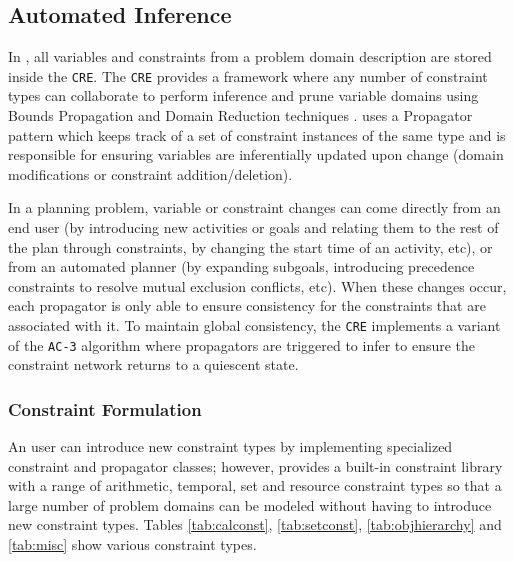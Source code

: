 \subsection{Automated Inference}
\label{sec:europa:inference}

In \eue, all variables and constraints from a problem domain
description are stored inside the \texttt{CRE}.  The \texttt{CRE}
provides a framework where any number of constraint types can
collaborate to perform inference and prune variable domains using
Bounds Propagation and Domain Reduction techniques \cite{marriott98}. 
\eu uses a Propagator pattern which keeps track of a set of
constraint instances of the same type and is responsible for ensuring
variables are inferentially updated upon change (domain modifications or
constraint addition/deletion).


In a planning problem, variable or constraint changes can come
directly from an end user (by introducing new activities or goals and
relating them to the rest of the plan through constraints, by changing
the start time of an activity, etc), or from an automated planner (by
expanding subgoals, introducing precedence constraints to resolve
mutual exclusion conflicts, etc). When these changes occur, each
propagator is only able to ensure consistency for the constraints that
are associated with it.  To maintain global consistency, the
\texttt{CRE} implements a variant of the \texttt{AC-3} algorithm
\cite{mackworth77} where propagators are triggered to infer to ensure
the constraint network returns to a quiescent state.

\subsubsection{Constraint Formulation}
\label{sec:europa:constraints}

An \eu user can introduce new constraint types by implementing
specialized constraint and propagator classes; however, \eu provides a
built-in constraint library with a range of arithmetic, temporal, set
and resource constraint types so that a large number of problem
domains can be modeled without having to introduce new constraint
types. Tables \ref{tab:calconst}, \ref{tab:setconst},
\ref{tab:objhierarchy} and \ref{tab:misc} show various constraint
types.



